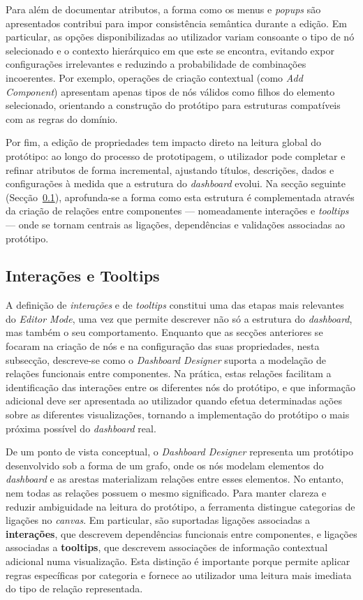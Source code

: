 Para além de documentar atributos, a forma como os menus e \textit{popups} são apresentados contribui para impor consistência semântica durante a edição. Em particular, as opções disponibilizadas ao utilizador variam consoante o tipo de nó selecionado e o contexto hierárquico em que este se encontra, evitando expor configurações irrelevantes e reduzindo a probabilidade de combinações incoerentes. Por exemplo, operações de criação contextual (como \textit{Add Component}) apresentam apenas tipos de nós válidos como filhos do elemento selecionado, orientando a construção do protótipo para estruturas compatíveis com as regras do domínio.

Por fim, a edição de propriedades tem impacto direto na leitura global do protótipo: ao longo do processo de prototipagem, o utilizador pode completar e refinar atributos de forma incremental, ajustando títulos, descrições, dados e configurações à medida que a estrutura do \textit{dashboard} evolui. Na secção seguinte (Secção~\ref{subsec:cap4_editor_interacoes_tooltips}), aprofunda-se a forma como esta estrutura é complementada através da criação de relações entre componentes --- nomeadamente interações e \textit{tooltips} --- onde se tornam centrais as ligações, dependências e validações associadas ao protótipo.

\subsection{Interações e Tooltips}
\label{subsec:cap4_editor_interacoes_tooltips}

A definição de \textit{interações} e de \textit{tooltips} constitui uma das etapas mais relevantes do \textit{Editor Mode}, uma vez que permite descrever não só a estrutura do \textit{dashboard}, mas também o seu comportamento. Enquanto que as secções anteriores se focaram na criação de nós e na configuração das suas propriedades, nesta subsecção, descreve-se como o \textit{Dashboard Designer} suporta a modelação de relações funcionais entre componentes. Na prática, estas relações facilitam a identificação das interações entre os diferentes nós do protótipo, e que informação adicional deve ser apresentada ao utilizador quando efetua determinadas ações sobre as diferentes visualizações, tornando a implementação do protótipo o mais próxima possível do \textit{dashboard} real.

De um ponto de vista conceptual, o \textit{Dashboard Designer} representa um protótipo desenvolvido sob a forma de um grafo, onde os nós modelam elementos do \textit{dashboard} e as arestas materializam relações entre esses elementos. No entanto, nem todas as relações possuem o mesmo significado. Para manter clareza e reduzir ambiguidade na leitura do protótipo, a ferramenta distingue categorias de ligações no \textit{canvas}. Em particular, são suportadas ligações associadas a \textbf{interações}, que descrevem dependências funcionais entre componentes, e ligações associadas a \textbf{tooltips}, que descrevem associações de informação contextual adicional numa visualização. Esta distinção é importante porque permite aplicar regras específicas por categoria e fornece ao utilizador uma leitura mais imediata do tipo de relação representada.

